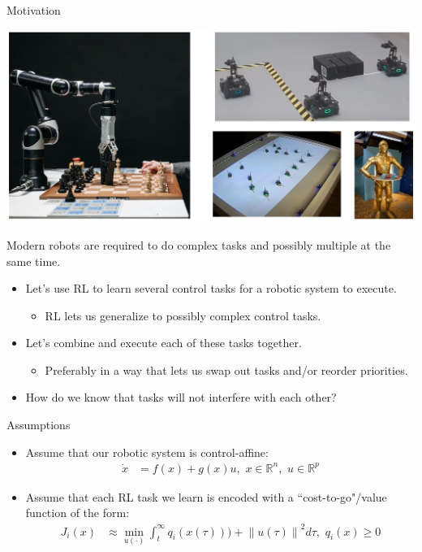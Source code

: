 \begin{frame}{Motivation}
	\begin{minipage}{\textwidth}
		\centering		
		\includegraphics[width=0.85\linewidth]{motivationsCombined}
	\end{minipage}%
	\seprule
	Modern robots are required to do complex tasks and possibly multiple at the same time.
\end{frame}

\begin{frame}
	\begin{itemize}
		\item{Let's use RL to learn several control tasks for a robotic system to execute.}
			\begin{itemize}
				\item{ RL lets us generalize to possibly complex control tasks.}
			\end{itemize}
		\item{Let's combine and execute each of these tasks together.}
			\begin{itemize}
				\item{Preferably in a way that lets us swap out tasks and/or reorder priorities.}
			\end{itemize}
		\item{ { \color{red} How do we know that tasks will not interfere with each other? } }
	\end{itemize}
\end{frame}

\begin{frame}{Assumptions}
	\begin{itemize}
		\item{Assume that our robotic system is control-affine:
	\begin{align*}
		\dot{x} &= f(x) + g(x)u, \,\, x \in \mathbb{R}^n, \,\, u \in \mathbb{R}^p
	\end{align*}}
		\item{Assume that each RL task we learn is encoded with a ``cost-to-go"/value function of the form:
	\begin{align*}
		J_i (x) &\approx \min_{u(\cdot)} \int_t^{\infty} q_i(x(\tau))) + {\lVert u(\tau) \rVert}^2 d \tau, \,\, q_i(x) \ge 0
	\end{align*}}
	\end{itemize}
\end{frame}

